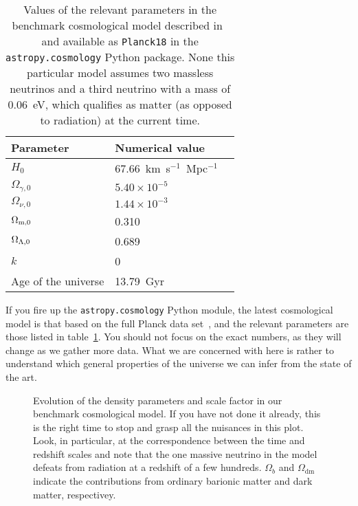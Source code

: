\begin{table}[htb!]
  \begin{tabular}{llr}
    \hline
    Parameter & Numerical value\\
    \hline
    \hline
    $H_0$ & $67.66$~km~s$^{-1}$~Mpc$^{-1}$\\
    $\Omega_{\gamma,0}$ & $5.40 \times 10^{-5}$\\
    $\Omega_{\nu,0}$ & $1.44 \times 10^{-3}$\\
    $\Omega_\text{m,0}$ & 0.310\\
    $\Omega_{\Lambda,0}$ & 0.689\\
    $k$ & 0\\
    Age of the universe & 13.79~Gyr\\
    \hline
  \end{tabular}
  \label{tab:cosmo_parameters}
  \caption{Values of the relevant parameters in the benchmark cosmological
  model described in~\cite{2020A&A...641A...6P} and available as
  \texttt{Planck18} in the \texttt{astropy.cosmology} Python package. None this
  particular model assumes two massless neutrinos and a third neutrino with a mass
  of 0.06~eV, which qualifies as matter (as opposed to radiation) at the current
  time.}
\end{table}

If you fire up the \texttt{astropy.cosmology} Python module, the latest cosmological
model is that based on the full Planck data set~\cite{2020A&A...641A...6P}, and the
relevant parameters are those listed in table~\ref{tab:cosmo_parameters}.
You should not focus on the exact numbers, as they will change as we gather more data.
What we are concerned with here is rather to understand which general properties
of the universe we can infer from the state of the art.

\begin{figure}[!htbp]
  
  \caption{Evolution of the density parameters and scale factor in our benchmark
  cosmological model. If you have not done it already, this is the right time to
  stop and grasp all the nuisances in this plot. Look, in particular, at the correspondence
  between the time and redshift scales and note that the one massive neutrino in
  the model defeats from radiation at a redshift of a few hundreds. $\Omega_b$ and
  $\Omega_\text{dm}$ indicate the contributions from ordinary barionic matter and
  dark matter, respectivey.}
  \label{fig:benchmark_density_parameters}
\end{figure}

